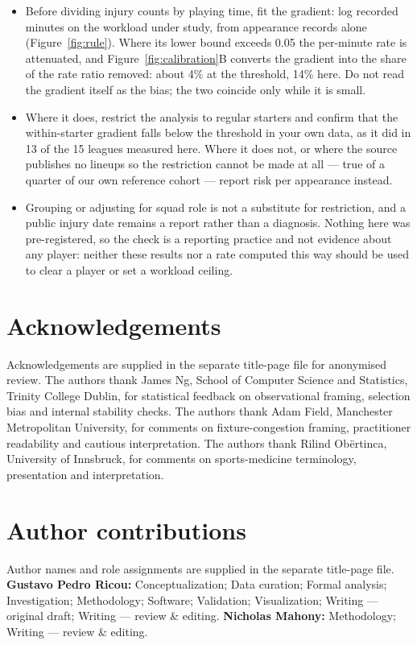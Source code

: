 \documentclass[11pt]{article}
\begin{document}
\begin{itemize}
\item Before dividing injury counts by playing time, fit the gradient: log recorded minutes on the workload under study, from appearance records alone (Figure~\ref{fig:rule}). Where its lower bound exceeds 0.05 the per-minute rate is attenuated, and Figure~\ref{fig:calibration}B converts the gradient into the share of the rate ratio removed: about 4\% at the threshold, 14\% here. Do not read the gradient itself as the bias; the two coincide only while it is small.
\item Where it does, restrict the analysis to regular starters and confirm that the within-starter gradient falls below the threshold in your own data, as it did in 13 of the 15 leagues measured here. Where it does not, or where the source publishes no lineups so the restriction cannot be made at all --- true of a quarter of our own reference cohort --- report risk per appearance instead.
\item Grouping or adjusting for squad role is not a substitute for restriction, and a public injury date remains a report rather than a diagnosis. Nothing here was pre-registered, so the check is a reporting practice and not evidence about any player: neither these results nor a rate computed this way should be used to clear a player or set a workload ceiling.
\end{itemize}

\section*{Acknowledgements}
\ifdefined\journalblindcopy
Acknowledgements are supplied in the separate title-page file for anonymised review.
\else
The authors thank James Ng, School of Computer Science and Statistics, Trinity College Dublin, for statistical feedback on observational framing, selection bias and internal stability checks. The authors thank Adam Field, Manchester Metropolitan University, for comments on fixture-congestion framing, practitioner readability and cautious interpretation. The authors thank Rilind Ob\"ertinca, University of Innsbruck, for comments on sports-medicine terminology, presentation and interpretation.
\fi

\section*{Author contributions}
\ifdefined\journalblindcopy
Author names and role assignments are supplied in the separate title-page file.
\else
\textbf{Gustavo Pedro Ricou:} Conceptualization; Data curation; Formal analysis; Investigation; Methodology; Software; Validation; Visualization; Writing --- original draft; Writing --- review \& editing. \textbf{Nicholas Mahony:} Methodology; Writing --- review \& editing.
\fi
\end{document}

